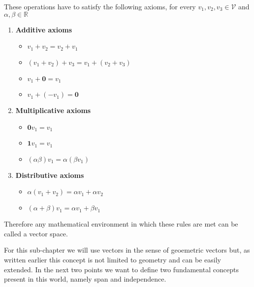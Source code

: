 These operations have to satisfy the following axioms, for every $v_1,v_2,v_3 \in \mathcal{V}$ and $\alpha, \beta \in \mathbb{R}$
\begin{enumerate}
    \item \textbf{Additive axioms}
    \begin{itemize}
        \item $v_1 + v_2 = v_2 + v_1$
        \item $(v_1+v_2)+v_3 = v_1+(v_2+v_3)$
        \item $v_1 + \mathbf{0} = v_1$
        \item $v_1 + (-v_1) = \mathbf{0}$
    \end{itemize}

    \item \textbf{Multiplicative axioms}
    \begin{itemize}
        \item $\mathbf{0}v_1= v_1$
        \item $\mathbf{1}v_1 = v_1$
        \item $(\alpha \beta) v_1 = \alpha (\beta v_1)$
    \end{itemize}

    \item \textbf{Distributive axioms}
    \begin{itemize}
        \item $\alpha (v_1 + v_2) = \alpha v_1 + \alpha v_2$
        \item $(\alpha + \beta)v_1 = \alpha v_1 + \beta v_1$
    \end{itemize}
\end{enumerate}
Therefore any mathematical environment in which these rules are met can be called a vector space. 

For this sub-chapter we will use vectors in the sense of geoemetric vectors but, as written earlier this concept is not limited to geometry and can be easily extended. In the next two points we want to define two fundamental concepts present in this world, namely span and independence.

